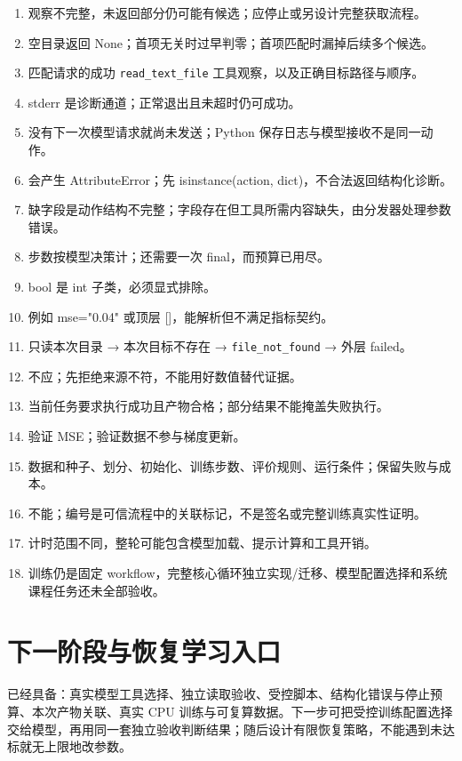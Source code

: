 \begin{enumerate}
\item 观察不完整，未返回部分仍可能有候选；应停止或另设计完整获取流程。
\item 空目录返回 None；首项无关时过早判零；首项匹配时漏掉后续多个候选。
\item 匹配请求的成功 \nolinkurl{read_text_file} 工具观察，以及正确目标路径与顺序。
\item stderr 是诊断通道；正常退出且未超时仍可成功。
\item 没有下一次模型请求就尚未发送；Python 保存日志与模型接收不是同一动作。
\item 会产生 AttributeError；先 isinstance(action, dict)，不合法返回结构化诊断。
\item 缺字段是动作结构不完整；字段存在但工具所需内容缺失，由分发器处理参数错误。
\item 步数按模型决策计；还需要一次 final，而预算已用尽。
\item bool 是 int 子类，必须显式排除。
\item 例如 mse="0.04" 或顶层 []，能解析但不满足指标契约。
\item 只读本次目录 → 本次目标不存在 → \nolinkurl{file_not_found} → 外层 failed。
\item 不应；先拒绝来源不符，不能用好数值替代证据。
\item 当前任务要求执行成功且产物合格；部分结果不能掩盖失败执行。
\item 验证 MSE；验证数据不参与梯度更新。
\item 数据和种子、划分、初始化、训练步数、评价规则、运行条件；保留失败与成本。
\item 不能；编号是可信流程中的关联标记，不是签名或完整训练真实性证明。
\item 计时范围不同，整轮可能包含模型加载、提示计算和工具开销。
\item 训练仍是固定 workflow，完整核心循环独立实现/迁移、模型配置选择和系统课程任务还未全部验收。
\end{enumerate}

\section{下一阶段与恢复学习入口}

已经具备：真实模型工具选择、独立读取验收、受控脚本、结构化错误与停止预算、本次产物关联、真实 CPU 训练与可复算数据。下一步可把受控训练配置选择交给模型，再用同一套独立验收判断结果；随后设计有限恢复策略，不能遇到未达标就无上限地改参数。

